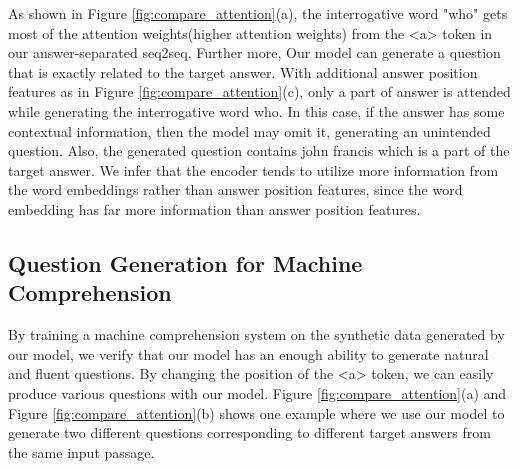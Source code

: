 \documentclass[letterpaper]{article} %
\begin{document}
As shown in Figure \ref{fig:compare_attention}(a), the interrogative word "who" gets most of the attention weights(higher attention weights) from the \textless{}a\textgreater{} token in our answer-separated seq2seq. Further more, Our model can generate a question that is exactly related to the target answer. With additional answer position features as in Figure \ref{fig:compare_attention}(c), only a part of answer is attended while generating the interrogative word who. In this case, if the answer has some contextual information, then the model may omit it, generating an unintended question. Also, the generated question contains john francis which is a part of the target answer. We infer that the encoder tends to utilize more information from the word embeddings rather than answer position features, since the word embedding has far more information than answer position features.
% 
% 
% 


\subsection{Question Generation for Machine Comprehension }
By training a machine comprehension system on the synthetic data generated by our model, we verify that our model has an enough ability to generate natural and fluent questions. By changing the position of the \textless a\textgreater{} token, we can easily produce various questions with our model. Figure \ref{fig:compare_attention}(a) and Figure \ref{fig:compare_attention}(b) shows one example where we use our model to generate two different questions corresponding to different target answers from the same input passage. 
% 
% 
\end{document}
